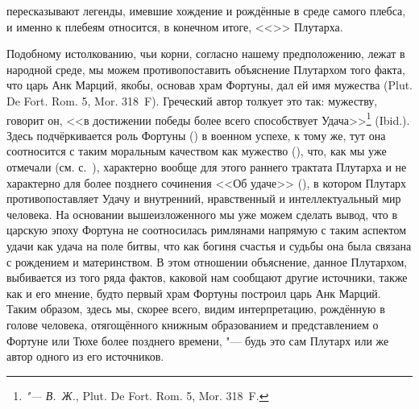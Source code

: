пересказывают легенды, имевшие хождение и рождённые в среде самого плебса, и именно к плебеям относится, в конечном итоге, <<>> Плутарха.

Подобному истолкованию, чьи корни, согласно нашему предположению, лежат в народной среде, мы можем противопоставить объяснение Плутархом того факта, что царь Анк Марций, якобы, основав храм Фортуны, дал ей имя мужества (Plut. De Fort. Rom. 5, Mor. 318~F). Греческий автор толкует это так: мужеству, говорит он, <<в достижении победы более всего способствует Удача>>\footnote{\graecafn{<~h| [>andre'ia|} \textit{"--- В.~Ж.}\graecafn{] ple~iston e>is t`o nik~an t'uqhs m'etesti}, Plut. De Fort. Rom. 5, Mor. 318~F.} (Ibid.). Здесь подчёркивается роль Фортуны () в военном успехе, к тому же, тут она соотносится с таким моральным качеством как мужество (), что, как мы уже отмечали (см. с.~\pageref{TycheAndEthos}), характерно вообще для этого раннего трактата Плутарха и не характерно для более позднего сочинения <<Об удаче>> (), в котором Плутарх противопоставляет Удачу и внутренний, нравственный и интеллектуальный мир человека. На основании вышеизложенного мы уже можем сделать вывод, что в царскую эпоху Фортуна не соотносилась римлянами напрямую с таким аспектом удачи как удача на поле битвы, что как богиня счастья и судьбы она была связана с рождением и материнством. В этом отношении объяснение, данное Плутархом, выбивается из того ряда фактов, каковой нам сообщают другие источники, также как и его мнение, будто первый храм Фортуны построил царь Анк Марций. Таким образом, здесь мы, скорее всего, видим интерпретацию, рождённую в голове человека, отягощённого книжным образованием и представлением о Фортуне или Тюхе более позднего времени, "--- будь это сам Плутарх или же автор одного из его источников.


